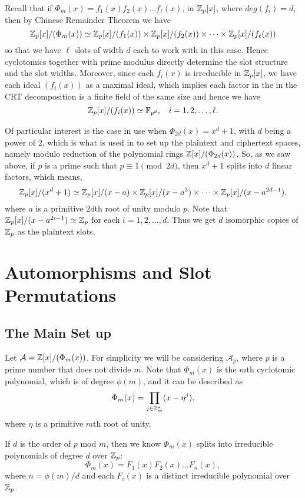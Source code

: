 \documentclass[12pt]{article}
\theoremstyle{plain}
\theoremstyle{definition}
\theoremstyle{remark}
\begin{document}
Recall that if $\Phi_m(x) = f_1(x)f_2(x)\dots f_{\ell}(x)$, in $\mathbb{Z}_p[x]$, where $deg(f_i)=d$, then by Chinese Remainder Theorem we have 
$$\mathbb{Z}_p[x]/(\Phi_m(x)) \simeq \mathbb{Z}_p[x]/(f_1(x))\times \mathbb{Z}_p[x]/(f_2(x)) \times \dots \times \mathbb{Z}_p[x]/(f_{\ell}(x))$$ so that we have $\ell$ slots of width $d$ each to work with in this case. Hence cyclotomics together with prime modulus directly determine the slot structure and the slot widths. Moreover, since each $f_i(x)$ is irreducible in $\mathbb{Z}_p[x]$, we have each ideal $(f_i(x))$ as a maximal ideal, which implies each factor in the in the CRT decomposition is a finite field of the same size and hence we have 
$$\mathbb{Z}_p[x]/(f_i(x)) \simeq \mathbb{F}_{p^d}, \:\:\:\: i=1, 2, \dots, \ell.$$

Of particular interest is the case in use when $\Phi_{2d}(x)=x^d+1$, with $d$ being a power of $2$, which is what is used in \cite{GHS} to set up the plaintext and ciphertext spaces, namely modulo reduction of the polynomial rings $\mathbb{Z}[x]/(\Phi_{2d}(x))$. So, as we saw above, if $p$ is a prime such that $p\equiv 1 \pmod{2d}$, then $x^d+1$ splits into $d$ linear factors, which means, 
$$\mathbb{Z}_p[x]/(x^d+1) \simeq \mathbb{Z}_p[x]/(x-a)\times \mathbb{Z}_p[x]/(x-a^3)\times \dots \times\mathbb{Z}_p[x]/(x-a^{2d-1}),$$
where $a$ is a primitive $2d$th root of unity modulo $p$. Note that $\mathbb{Z}_p[x]/(x-a^{2i-1})\simeq \mathbb{Z}_p$ for each $i=1,2, \dots, d$. Thus we get $d$ isomorphic copies of $\mathbb{Z}_p$ as the plaintext slots. 

\section{Automorphisms and Slot Permutations}
\subsection{The Main Set up}
Let $\mathcal{A} = \mathbb{Z}[x]/(\Phi_m(x))$. For simplicity we will be considering $\mathcal{A}_p$, where $p$ is a prime number that does not divide $m$. Note that $\Phi_m(x)$ is the $m$th cyclotomic polynomial, which is of degree $\phi(m)$, and it can be described as 
$$\Phi_m(x) = \prod_{j\in\mathbb{Z}_m^*}(x-\eta^j),$$
where $\eta$ is a primitive $m$th root of unity. 

If $d$ is the order of $p$ mod $m$, then we know $\Phi_m(x)$ splits into irreducible polynomials of degree $d$ over $\mathbb{Z}_p$:
$$\Phi_m(x) = F_1(x)F_2(x)\dots F_n(x),$$
where $n=\phi(m)/d$ and each $F_i(x)$ is a distinct irreducible polynomial over $\mathbb{Z}_p$. 
\end{document}
